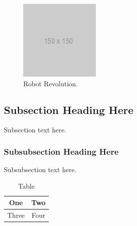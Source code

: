\documentclass[10pt,journal,compsoc]{IEEEtran}
\begin{document}
		\begin{figure}[thpb]
			\centering
			\includegraphics[width=\linewidth]{placeholder}
			\caption{Robot Revolution.}
			\label{fig:robot1}
		\end{figure}
		
		\subsection{Subsection Heading Here}
		Subsection text here.
		
		\subsubsection{Subsubsection Heading Here}
		Subsubsection text here.
		
		
		\begin{table}[h]
			\caption{Table}
			\label{table_example}
			\begin{center}
				\begin{tabular}{|c||c|}
					\hline
					One & Two\\
					\hline
					Three & Four\\
					\hline
				\end{tabular}
			\end{center}
		\end{table}
		
\end{document}
